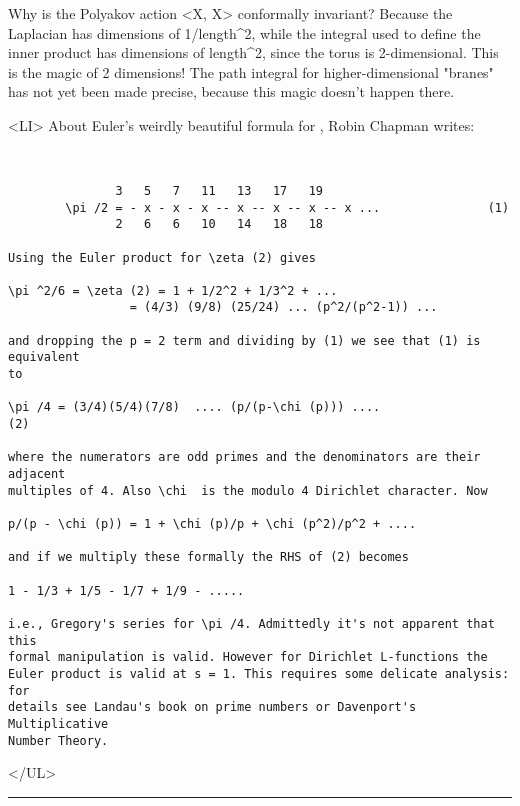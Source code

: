 Why is the Polyakov action <X, \Delta X> conformally invariant?
Because the Laplacian has dimensions of 1/length^{2}, 
while the integral
used to define the inner product has dimensions of length^{2}, 
since the
torus is 2-dimensional.  This is the magic of 2 dimensions!  The path
integral for higher-dimensional "branes" has not yet been made
precise, because this magic doesn't happen there.

<LI>
About Euler's weirdly beautiful formula for \pi , Robin Chapman writes:

\begin{verbatim}


               3   5   7   11   13   17   19
        \pi /2 = - x - x - x -- x -- x -- x -- x ...               (1)
               2   6   6   10   14   18   18

Using the Euler product for \zeta (2) gives

\pi ^2/6 = \zeta (2) = 1 + 1/2^2 + 1/3^2 + ...
                 = (4/3) (9/8) (25/24) ... (p^2/(p^2-1)) ...

and dropping the p = 2 term and dividing by (1) we see that (1) is equivalent
to

\pi /4 = (3/4)(5/4)(7/8)  .... (p/(p-\chi (p))) ....                  (2)

where the numerators are odd primes and the denominators are their adjacent
multiples of 4. Also \chi  is the modulo 4 Dirichlet character. Now

p/(p - \chi (p)) = 1 + \chi (p)/p + \chi (p^2)/p^2 + .... 

and if we multiply these formally the RHS of (2) becomes

1 - 1/3 + 1/5 - 1/7 + 1/9 - .....

i.e., Gregory's series for \pi /4. Admittedly it's not apparent that this
formal manipulation is valid. However for Dirichlet L-functions the
Euler product is valid at s = 1. This requires some delicate analysis: for
details see Landau's book on prime numbers or Davenport's Multiplicative
Number Theory.

\end{verbatim}
    
</UL>


 \par\noindent\rule{\textwidth}{0.4pt}

